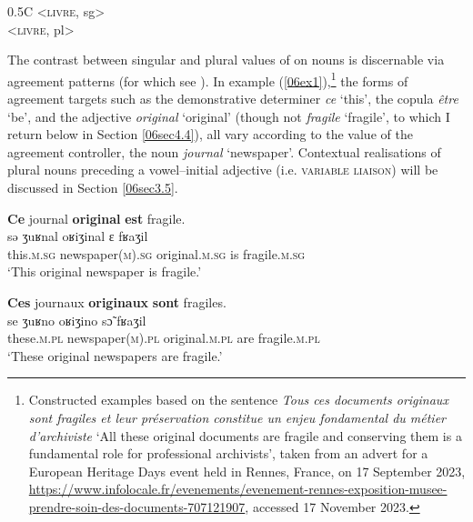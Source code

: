 \documentclass[output=paper,colorlinks,citecolor=brown]{langscibook}
\begin{document}
\begin{table}[ht]
	\centering
	\begin{tabularx}{0.5\textwidth}{C}
		\lsptoprule
			<\textsc{livre}, {sg}> \\
			<\textsc{livre}, {pl}> \\
		\lspbottomrule
	\end{tabularx}
	\caption{Content paradigm of Fr. \emph{livre} ‘book’.}
	\label{06tab2}
\end{table}

The contrast between singular and plural values of  on nouns is discernable via agreement patterns (for which see \citealt[4--5, 35, 40--43]{corbett2006}). In example (\ref{06ex1}),\footnote{Constructed examples based on the sentence \emph{Tous ces documents originaux sont fragiles et leur préservation constitue un enjeu fondamental du métier d'archiviste} `All these original documents are fragile and conserving them is a fundamental role for professional archivists', taken from an advert for a European Heritage Days event held in Rennes, France, on 17 September 2023, \url{https://www.infolocale.fr/evenements/evenement-rennes-exposition-musee-prendre-soin-des-documents-707121907}, accessed 17 November 2023.} the forms of agreement targets such as the demonstrative determiner \emph{ce} `this', the copula \emph{être} `be', and the adjective \emph{original} `original' (though not \emph{fragile} `fragile', to which I return below in Section \ref{06sec4.4}), all vary according to the  value of the agreement controller, the noun \emph{journal} `newspaper'. Contextual realisations of plural nouns preceding a vowel--initial adjective (i.e. \textsc{variable liaison}) will be discussed in Section \ref{06sec3.5}.

\begin{exe}
	\ex \label{06ex1}
	\begin{xlist}
		\ex
		\glll \textbf{Ce} journal \textbf{original} \textbf{est} fragile. \\
		sǝ ʒuʁnal oʁiʒinal ɛ fʁaʒil \\
		this.\textsc{m.sg} newspaper\textsc{(m).sg} original.\textsc{m.sg} is fragile.\textsc{m.sg} \\
		\trans ‘This original newspaper is fragile.’
		
		\ex
		\glll \textbf{Ces} journaux \textbf{originaux} \textbf{sont} fragiles. \\
		se ʒuʁno oʁiʒino sɔ̃ fʁaʒil \\
		these.\textsc{m.pl} newspaper\textsc{(m).pl} original.\textsc{m.pl} are fragile.\textsc{m.pl} \\
		\trans ‘These original newspapers are fragile.’
	\end{xlist}
\end{exe}
\end{document}
